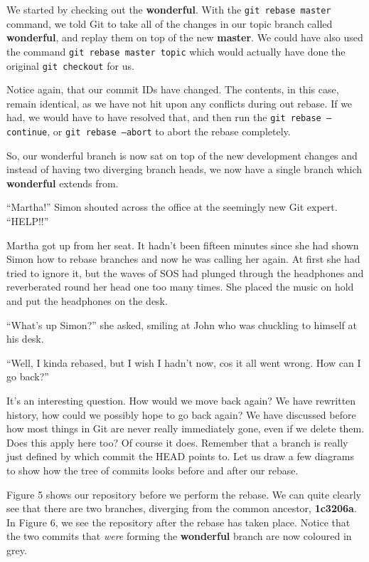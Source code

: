 We started by checking out the \textbf{wonderful}.
With the \texttt{git rebase master} command, we told Git to take all of the changes in our topic branch called \textbf{wonderful}, and replay them on top of the new \textbf{master}.
We could have also used the command \texttt{git rebase master topic} which would actually have done the original \texttt{git checkout} for us.

Notice again, that our commit IDs have changed.
The contents, in this case, remain identical, as we have not hit upon any conflicts during out rebase.
If we had, we would have to have resolved that, and then run the \texttt{git rebase --continue}, or \texttt{git rebase --abort} to abort the rebase completely.

So, our wonderful branch is now sat on top of the new development changes and instead of having two diverging branch heads, we now have a single branch which \textbf{wonderful} extends from.

\begin{trenches}
``Martha!'' Simon shouted across the office at the seemingly new Git expert.
``HELP!!''

Martha got up from her seat.
It hadn't been fifteen minutes since she had shown Simon how to rebase branches and now he was calling her again.
At first she had tried to ignore it, but the waves of SOS had plunged through the headphones and reverberated round her head one too many times.
She placed the music on hold and put the headphones on the desk.

``What's up Simon?'' she asked, smiling at John who was chuckling to himself at his desk.

``Well, I kinda rebased, but I wish I hadn't now, cos it all went wrong. How can I go back?''
\end{trenches}

It's an interesting question.
How would we move back again? We have rewritten history, how could we possibly hope to go back again? We have discussed before how most things in Git are never really immediately gone, even if we delete them.
Does this apply here too? Of course it does.
Remember that a branch is really just defined by which commit the HEAD points to.
Let us draw a few diagrams to show how the tree of commits looks before and after our rebase.


Figure 5 shows our repository before we perform the rebase.
We can quite clearly see that there are two branches, diverging from the common ancestor, \textbf{1c3206a}.
In Figure 6, we see the repository after the rebase has taken place.
Notice that the two commits that \emph{were} forming the \textbf{wonderful} branch are now coloured in grey.

